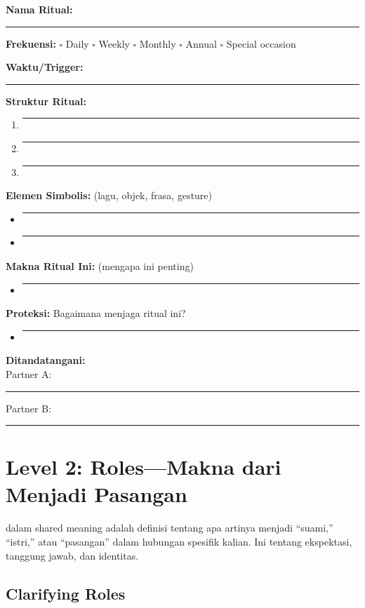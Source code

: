 \begin{exercisebox}
\textbf{Nama Ritual:} \rule{8cm}{0.4pt}

\textbf{Frekuensi:} $\square$ Daily $\square$ Weekly $\square$ Monthly $\square$ Annual $\square$ Special occasion

\textbf{Waktu/Trigger:} \rule{8cm}{0.4pt}

\textbf{Struktur Ritual:}
\begin{enumerate}
    \item \rule{12cm}{0.4pt}
    \item \rule{12cm}{0.4pt}
    \item \rule{12cm}{0.4pt}
\end{enumerate}

\textbf{Elemen Simbolis:} (lagu, objek, frasa, gesture)
\begin{itemize}
    \item \rule{12cm}{0.4pt}
    \item \rule{12cm}{0.4pt}
\end{itemize}

\textbf{Makna Ritual Ini:} (mengapa ini penting)
\begin{itemize}
    \item \rule{12cm}{0.4pt}
\end{itemize}

\textbf{Proteksi:} Bagaimana menjaga ritual ini?
\begin{itemize}
    \item \rule{12cm}{0.4pt}
\end{itemize}

\textbf{Ditandatangani:}\\
Partner A: \rule{5cm}{0.4pt} Partner B: \rule{5cm}{0.4pt}
\end{exercisebox}

\section{Level 2: Roles---Makna dari Menjadi Pasangan}

 dalam shared meaning adalah definisi tentang apa artinya menjadi ``suami,'' ``istri,'' atau ``pasangan'' dalam hubungan spesifik kalian. Ini tentang ekspektasi, tanggung jawab, dan identitas.

\subsection{Clarifying Roles}

